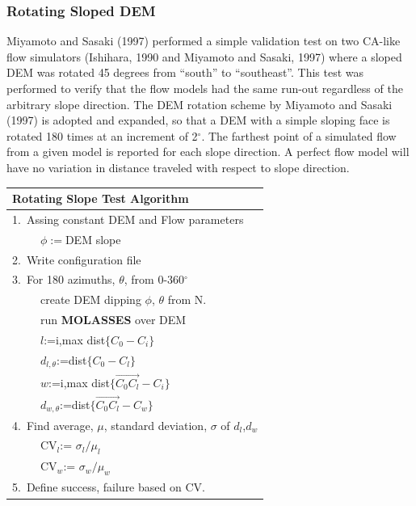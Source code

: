 \documentclass[12pt,letter]{article}
\newcommand{\tabitem}{~~\llap{\textbullet}~~}
\newcommand{\tabitem}{~~\llap{\textbullet}~~}
\begin{document}
		\subsubsection{Rotating Sloped DEM}
			Miyamoto and Sasaki (1997) performed a simple validation test on two CA-like flow simulators (Ishihara, 1990 and Miyamoto and Sasaki, 1997) where a sloped DEM was rotated 45 degrees from ``south'' to ``southeast''. This test was performed to verify that the flow models had the same run-out regardless of the arbitrary slope direction. The DEM rotation scheme by Miyamoto and Sasaki (1997) is adopted and expanded, so that a DEM with a simple sloping face is rotated 180 times at an increment of 2$^{\circ}$. The farthest point of a simulated flow from a given model is reported for each slope direction. A perfect flow model will have no variation in distance traveled with respect to slope direction.

			\begin{center}
				\begin{tabular}{l}
					\toprule
					\textbf{Rotating Slope Test Algorithm}\\
					\midrule
					1.~Assing constant DEM and Flow parameters\\
						~\tabitem $\phi:=$DEM slope\\
					2.~Write configuration file\\
					3.~For 180 azimuths, $\theta$, from 0-360$^{\circ}$\\
						~\tabitem create DEM dipping $\phi$, $\theta$ from N.\\
						~\tabitem run \textbf{MOLASSES} over DEM\\
						~\tabitem $l$:=i,max dist$\{C_0-C_i\}$\\
						~\tabitem $d_{l,\theta}$:=dist$\{C_0-C_l\}$\\
						~\tabitem $w$:=i,max dist$\{\overrightarrow{C_0C_l}-C_i\}$\\
						~\tabitem $d_{w,\theta}$:=dist$\{\overrightarrow{C_0C_l}-C_w\}$\\
					4.~Find average, $\mu$, standard deviation, $\sigma$ of $d_l$,$d_w$\\
						~\tabitem CV$_l$:= $\sigma_l/\mu_l$\\
						~\tabitem CV$_w$:= $\sigma_w/\mu_w$\\
					5.~Define success, failure based on CV.\\
					\bottomrule
				\end{tabular}
			\end{center}
\end{document}
